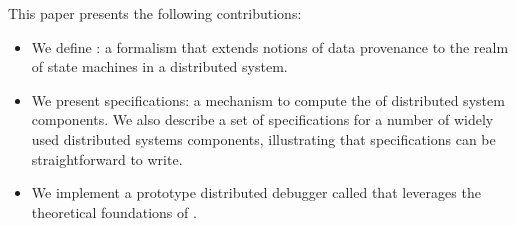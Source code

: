 This paper presents the following contributions:
\begin{itemize}
  \item
    We define \watprovenance{}: a formalism that extends notions of data
    provenance to the realm of state machines in a distributed system.
  \item
    We present \watprovenance{} specifications: a mechanism to compute the
    \watprovenance{} of distributed system components. We also describe a set
    of \watprovenance{} specifications for a number of widely used distributed
    systems components, illustrating that \watprovenance{} specifications can
    be straightforward to write.
  \item
    We implement a prototype distributed debugger called \fluent{} that
    leverages the theoretical foundations of \watprovenance{}.
\end{itemize}
